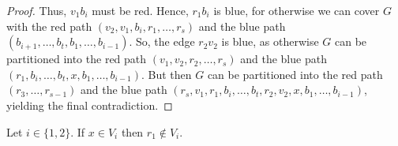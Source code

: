 \documentclass[a4paper,10pt]{article}
\begin{document}
\begin{proof}
Thus, $v_1b_i$ must be red.
Hence, $r_1b_i$ is blue, for otherwise we can cover  $G$ with the red path $(v_2,v_1,b_i,r_1,\ldots,r_s)$ and the blue path $(b_{i+1},\ldots,b_t,b_1,\ldots,b_{i-1})$.
So, the edge $r_2v_2$ is blue, as otherwise $G$ can be partitioned into the red path $(v_1,v_2,r_2,\ldots,r_s)$ and the blue path $(r_1,b_i,\ldots,b_t,x,b_1,\ldots,b_{i-1})$.
But then $G$ can be partitioned into the red path $(r_3,\ldots,r_{s-1})$ and the blue path $(r_s,v_1,r_1,b_i,\ldots,b_t,r_2,v_2,x,b_1,\ldots,b_{i-1})$, yielding the final contradiction.
\end{proof}

\begin{claim}\label{xinV1r1inV1gehtnicht}
Let $i\in\{1,2\}$. If $x\in V_i$ then $r_1\notin V_{i}$.
\end{claim}
\end{document}
